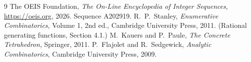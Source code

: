 \documentclass[11pt,a4paper]{article}
\theoremstyle{plain}
\theoremstyle{definition}
\begin{document}
\begin{thebibliography}{9}
 The OEIS Foundation, \emph{The On-Line Encyclopedia of Integer
Sequences}, \url{https://oeis.org}, 2026. Sequence A202919.
 R.~P.~Stanley, \emph{Enumerative Combinatorics}, Volume 1, 2nd ed.,
Cambridge University Press, 2011. (Rational generating functions, Section 4.1.)
 M.~Kauers and P.~Paule, \emph{The Concrete Tetrahedron}, Springer, 2011.
 P.~Flajolet and R.~Sedgewick, \emph{Analytic Combinatorics}, Cambridge
University Press, 2009.
\end{thebibliography}
\end{document}
